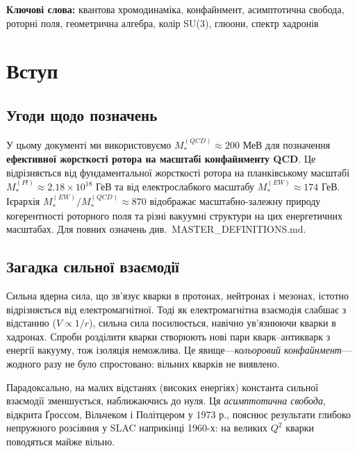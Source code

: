 \documentclass[11pt,a4paper]{article}
\theoremstyle{definition}
\theoremstyle{plain}
\theoremstyle{remark}
\begin{document}
\noindent\textbf{Ключові слова:} квантова хромодинаміка, конфайнмент, асимптотична свобода, роторні поля, геометрична алгебра, колір SU(3), глюони, спектр хадронів

\tableofcontents
\newpage

\section{Вступ}
\label{sec:introduction}

\subsection{Угоди щодо позначень}

У цьому документі ми використовуємо $M_*^{(QCD)} \approx 200$ МеВ для позначення \textbf{ефективної жорсткості ротора на масштабі конфайнменту QCD}. Це відрізняється від фундаментальної жорсткості ротора на планківському масштабі $M_*^{(Pl)} \approx 2{.}18 \times 10^{18}$ ГеВ та від електрослабкого масштабу $M_*^{(EW)} \approx 174$ ГеВ. Ієрархія $M_*^{(EW)}/M_*^{(QCD)} \approx 870$ відображає масштабно-залежну природу когерентності роторного поля та різні вакуумні структури на цих енергетичних масштабах. Для повних означень див.\ MASTER\_DEFINITIONS.md.

\subsection{Загадка сильної взаємодії}

Сильна ядерна сила, що зв’язує кварки в протонах, нейтронах і мезонах, істотно відрізняється від електромагнітної. Тоді як електромагнітна взаємодія слабшає з відстанню ($V \propto 1/r$), сильна сила посилюється, навічно ув’язнюючи кварки в хадронах. Спроби розділити кварки створюють нові пари кварк–антикварк з енергії вакууму, тож ізоляція неможлива. Це явище—\emph{кольоровий конфайнмент}—жодного разу не було спростовано: вільних кварків не виявлено.

Парадоксально, на малих відстанях (високих енергіях) константа сильної взаємодії зменшується, наближаючись до нуля. Ця \emph{асимптотична свобода}, відкрита Ґроссом, Вільчеком і Політцером у 1973 р., пояснює результати глибоко непружного розсіяння у SLAC наприкінці 1960-х: на великих $Q^2$ кварки поводяться майже вільно.
\end{document}
